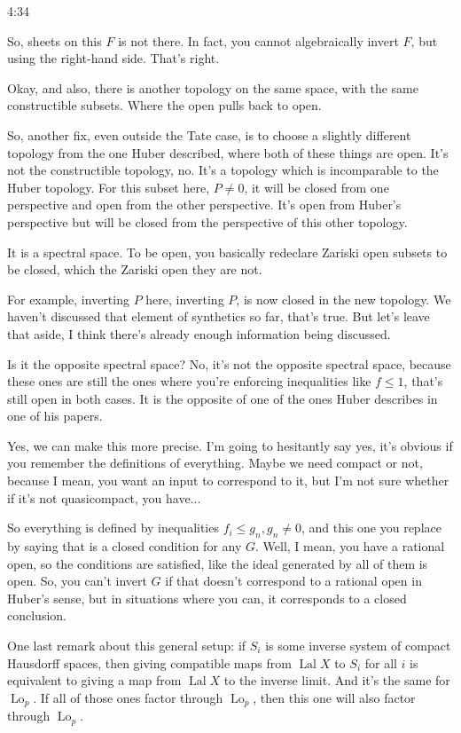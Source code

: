 \begin{unfinished}{4:34}
\begin{example}
So, sheets on this $F$ is not there. In fact, you cannot algebraically invert $F$, but using the right-hand side. That's right.

Okay, and also, there is another topology on the same space, with the same constructible subsets. Where the open pulls back to open.

So, another fix, even outside the Tate case, is to choose a slightly different topology from the one Huber described, where both of these things are open. It's not the constructible topology, no. It's a topology which is incomparable to the Huber topology. For this subset here, $P \neq 0$, it will be closed from one perspective and open from the other perspective. It's open from Huber's perspective but will be closed from the perspective of this other topology.

It is a spectral space. To be open, you basically redeclare Zariski open subsets to be closed, which the Zariski open they are not.

For example, inverting $P$ here, inverting $P$, is now closed in the new topology. We haven't discussed that element of synthetics so far, that's true. But let's leave that aside, I think there's already enough information being discussed.

Is it the opposite spectral space? No, it's not the opposite spectral space, because these ones are still the ones where you're enforcing inequalities like $f \leq 1$, that's still open in both cases. It is the opposite of one of the ones Huber describes in one of his papers.

Yes, we can make this more precise. I'm going to hesitantly say yes, it's obvious if you remember the definitions of everything. Maybe we need compact or not, because I mean, you want an input to correspond to it, but I'm not sure whether if it's not quasicompact, you have...

So everything is defined by inequalities $f_i \leq g_n, g_n \neq 0$, and this one you replace by saying that is a closed condition for any $G$. Well, I mean, you have a rational open, so the conditions are satisfied, like the ideal generated by all of them is open. So, you can't invert $G$ if that doesn't correspond to a rational open in Huber's sense, but in situations where you can, it corresponds to a closed conclusion.

One last remark about this general setup: if $S_i$ is some inverse system of compact Hausdorff spaces, then giving compatible maps from $\operatorname{Lal} X$ to $S_i$ for all $i$ is equivalent to giving a map from $\operatorname{Lal} X$ to the inverse limit. And it's the same for $\operatorname{Lo}_p$. If all of those ones factor through $\operatorname{Lo}_p$, then this one will also factor through $\operatorname{Lo}_p$.


\end{example}
\end{unfinished}
